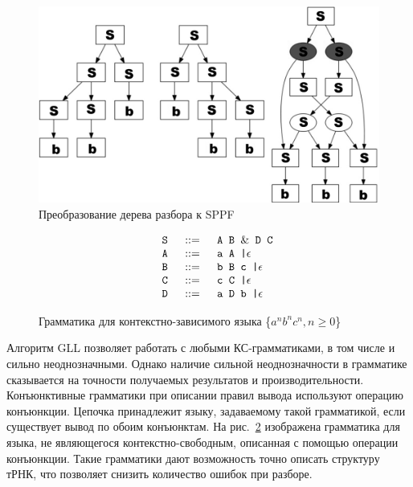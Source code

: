 \begin{figure}
\centering
\includegraphics[width=\textwidth]{Gorokhov/courseworkpictures/SPPF.PNG}
\caption{Преобразование дерева разбора к SPPF}
\label{SPPF}
\end{figure}

\begin{figure}
$$
\begin{array}{crcl}
& \mbox{\texttt{ S }} &::=& \mbox{\texttt{ A B }} \& \mbox{\texttt{ D C}} \\
& \mbox{\texttt{ A }} & ::=& \mbox{\texttt{ a A |}}  \epsilon \\
& \mbox{\texttt{ B }} & ::=& \mbox{\texttt{ b B c |}}  \epsilon \\
& \mbox{\texttt{ C }} & ::=& \mbox{\texttt{ c C |}}  \epsilon \\
& \mbox{\texttt{ D }} & ::=& \mbox{\texttt{ a D b |}}\epsilon \\
\end{array}
$$
\caption{Грамматика для контекстно-зависимого языка \{$a^n b^n c^n, n \geq 0$\}}
\label{gabc}
\end{figure}

Алгоритм GLL позволяет работать с любыми КС-грамматиками, в том числе и сильно неоднозначными. Однако наличие сильной неоднозначности в грамматике сказывается на точности получаемых результатов и производительности. Конъюнктивные грамматики при описании правил вывода используют операцию конъюнкции. Цепочка принадлежит языку, задаваемому такой грамматикой, если существует вывод по обоим конъюнктам. На рис.~\ref{gabc} изображена грамматика для языка, не являющегося контекстно-свободным, описанная с помощью операции конъюнкции. Такие грамматики дают возможность точно описать структуру тРНК, что позволяет снизить количество ошибок при разборе.

